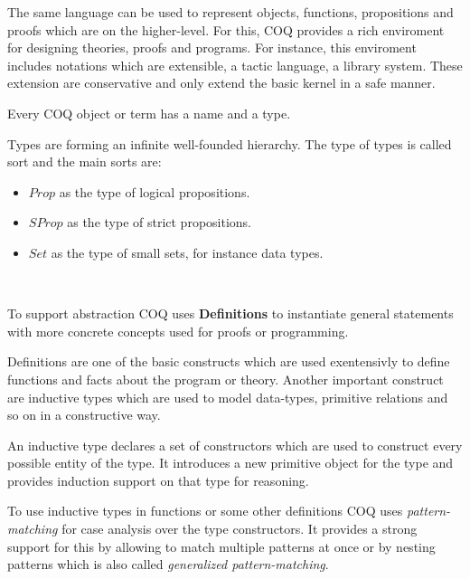 The same language can be used to represent objects, functions, propositions
and proofs which are on the higher-level. For this, COQ provides a
rich enviroment for designing theories, proofs and programs. For instance,
this enviroment includes notations which are extensible, a tactic language,
a library system. These extension are conservative and only extend the
basic kernel in a safe manner.~\cite{paulin2011introduction}

\begin{defi}
  Every COQ object or term has a name and a type.
\end{defi}

\begin{defi}
  Types are forming an infinite well-founded hierarchy.
  The type of types is called sort and the main sorts are:
  \begin{itemize}
  \item $Prop$ as the type of logical propositions.
  \item $SProp$ as the type of strict propositions.
  \item $Set$ as the type of small sets, for instance data types.
  \end{itemize}~\cite{the_coq_development_team_2019_2554024}
\end{defi}

\begin{defi}
  To support abstraction COQ uses \textbf{Definitions} to instantiate
  general statements with more concrete concepts used for proofs
  or programming.~\cite{huet1997coq}
\end{defi}

Definitions are one of the basic constructs which are used exentensivly
to define functions and facts about the program or theory.
Another important construct are inductive types which are used to model
data-types, primitive relations and so on in a constructive way.~\cite{paulin2011introduction}

\begin{defi}
  An inductive type declares a set of constructors which are used
  to construct every possible entity of the type. It introduces
  a new primitive object for the type and provides induction support
  on that type for reasoning.~\cite{paulin2011introduction}
\end{defi}

To use inductive types in functions or some other definitions COQ
uses \textit{pattern-matching} for case analysis over the type
constructors. It provides a strong support for this by allowing
to match multiple patterns at once or by nesting patterns which
is also called \textit{generalized
  pattern-matching}.~\cite{paulin2011introduction}

